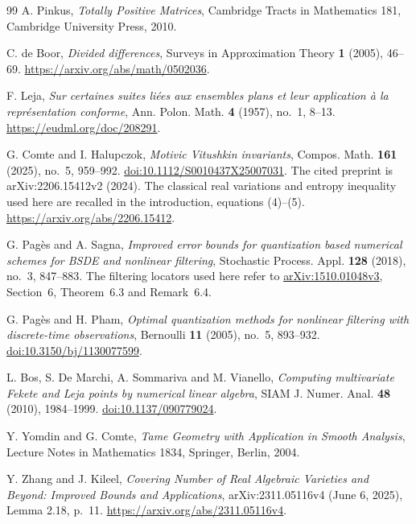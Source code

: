 \begin{thebibliography}{99}
A. Pinkus, \emph{Totally Positive Matrices}, Cambridge Tracts in
Mathematics 181, Cambridge University Press, 2010.

C. de Boor, \emph{Divided differences}, Surveys in Approximation Theory
\textbf{1} (2005), 46--69. \url{https://arxiv.org/abs/math/0502036}.

F. Leja, \emph{Sur certaines suites li\'ees aux ensembles plans et leur
application \`a la repr\'esentation conforme}, Ann. Polon. Math.
\textbf{4} (1957), no.~1, 8--13.
\url{https://eudml.org/doc/208291}.

G. Comte and I. Halupczok, \emph{Motivic Vitushkin invariants},
Compos. Math. \textbf{161} (2025), no.~5, 959--992.
\href{https://doi.org/10.1112/S0010437X25007031}{doi:10.1112/S0010437X25007031}.
The cited preprint is arXiv:2206.15412v2 (2024). The classical real variations and entropy
inequality used here are recalled in the introduction, equations (4)--(5).
\url{https://arxiv.org/abs/2206.15412}.

G. Pag\`es and A. Sagna, \emph{Improved error bounds for quantization
based numerical schemes for BSDE and nonlinear filtering},
Stochastic Process. Appl. \textbf{128} (2018), no.~3, 847--883.
The filtering locators used here refer to
\href{https://arxiv.org/abs/1510.01048v3}{arXiv:1510.01048v3},
Section~6, Theorem~6.3 and Remark~6.4.

G. Pag\`es and H. Pham, \emph{Optimal quantization methods for nonlinear
filtering with discrete-time observations}, Bernoulli \textbf{11}
(2005), no.~5, 893--932.
\href{https://doi.org/10.3150/bj/1130077599}{doi:10.3150/bj/1130077599}.

L. Bos, S. De Marchi, A. Sommariva and M. Vianello,
\emph{Computing multivariate Fekete and Leja points by numerical linear
algebra}, SIAM J. Numer. Anal. \textbf{48} (2010), 1984--1999.
\href{https://doi.org/10.1137/090779024}{doi:10.1137/090779024}.

Y. Yomdin and G. Comte, \emph{Tame Geometry with Application in Smooth
Analysis}, Lecture Notes in Mathematics 1834, Springer, Berlin, 2004.

Y. Zhang and J. Kileel, \emph{Covering Number of Real Algebraic Varieties
and Beyond: Improved Bounds and Applications}, arXiv:2311.05116v4 (June 6, 2025),
Lemma 2.18, p.~11. \url{https://arxiv.org/abs/2311.05116v4}.
\end{thebibliography}
